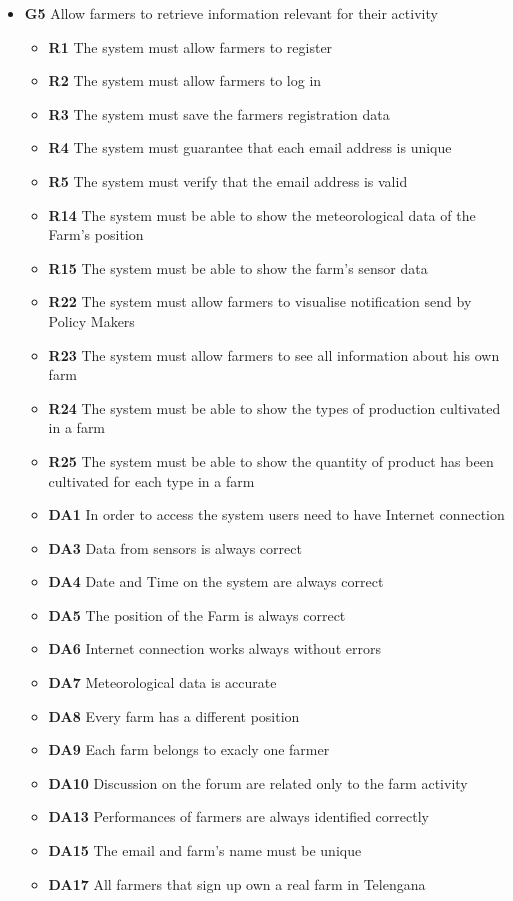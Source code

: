 \begin{itemize}
    \item \textbf{G5} Allow farmers to retrieve information relevant for their activity
        \begin{itemize}
        \renewcommand\labelitemi{--}
        \item \textbf{R1} The system must allow farmers to register
        \item \textbf{R2} The system must allow farmers to log in
        \item \textbf{R3} The system must save the farmers registration data
        \item \textbf{R4} The system must guarantee that each email address is unique
        \item \textbf{R5} The system must verify that the email address is valid
        \item \textbf{R14} The system must be able to show the meteorological data of the Farm’s position
        \item \textbf{R15} The system must be able to show the farm’s sensor data
        \item \textbf{R22} The system must allow farmers to visualise notification send by Policy Makers
        \item \textbf{R23} The system must allow farmers to see all information about his own farm
        \item \textbf{R24} The system must be able to show the types of production cultivated in a farm
        \item \textbf{R25} The system must be able to show the quantity of product has been cultivated for each type in a farm
        \item \textbf{DA1} In order to access the system users need to have Internet connection
        \item \textbf{DA3} Data from sensors is always correct
        \item \textbf{DA4} Date and Time on the system are always correct
        \item \textbf{DA5} The position of the Farm is always correct
        \item \textbf{DA6} Internet connection works always without errors
        \item \textbf{DA7} Meteorological data is accurate
        \item \textbf{DA8} Every farm has a different position
        \item \textbf{DA9} Each farm belongs to exacly one farmer
        \item \textbf{DA10} Discussion on the forum are related only to the farm activity
        \item \textbf{DA13} Performances of farmers are always identified correctly
        \item \textbf{DA15} The email and farm's name must be unique
        \item \textbf{DA17} All farmers that sign up own a real farm in Telengana
        \end{itemize} 
        

\end{itemize}
